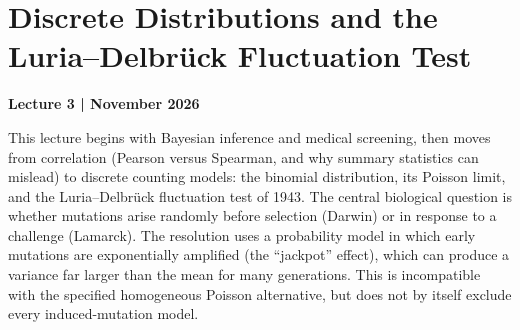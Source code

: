 \chapter{Discrete Distributions and the Luria--Delbr{\"u}ck Fluctuation Test}\label{chap:lecture03}
\noindent\textbf{Lecture 3 \enspace| November 2026}

This lecture begins with Bayesian inference and medical screening, then moves from correlation (Pearson versus Spearman, and why summary statistics can mislead) to discrete counting models: the binomial distribution, its Poisson limit, and the Luria--Delbr{\"u}ck fluctuation test of 1943. The central biological question is whether mutations arise randomly before selection (Darwin) or in response to a challenge (Lamarck). The resolution uses a probability model in which early mutations are exponentially amplified (the ``jackpot'' effect), which can produce a variance far larger than the mean for many generations. This is incompatible with the specified homogeneous Poisson alternative, but does not by itself exclude every induced-mutation model.

